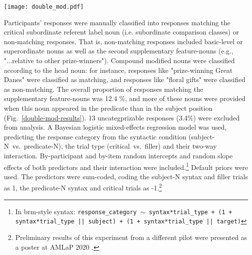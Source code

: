 \begin{figure*}[h]
	\begin{center}
		\texttt{[image: double\_mod.pdf]}
	\end{center}
	\vspace{-0.3cm}
	\caption{Experiment 4 pilot results: Proportions of inferred comparison classes in terms of responses not matching the critical subordinate target label (e.g.,~“...big relative to other dogs/prize-winners/animals”), depending on syntactic position of the noun (x-axis) and trial-type (facets). Error-bars denote bootstrapped 95\% confidence intervals.}
	\label{double-mod-results}
\end{figure*}


Participants' responses were manually classified into responses matching the critical subordinate referent label noun (i.e. subordinate comparison classes) or non-matching responses. That is, non-matching responses included basic-level or superordinate nouns as well as the second supplementary feature-nouns (e.g., "...relative to other prize-winners"). Compound modified nouns were classified according to the head noun: for instance, responses like "prize-winning Great Danes" were classified as matching, and responses like "floral gifts" were classified as non-matching. The overall proportion of responses matching the supplementary feature-nouns was 12.4 \%, and more of these nouns were provided when this noun appeared in the predicate than in the subject position (Fig.~\ref{double-mod-results}). 
13 uncategprizable responses (3.4\%) were excluded from analysis. 
A Bayesian logistic mixed-effects regression model was used, predicting the response category from the syntactic condition (subject-N~vs.~predicate-N), the trial type (critical~vs.~filler) and their two-way interaction. By-participant and by-item random intercepts and random slope effects of both predictors and their interaction were included.\footnote{In brm-style syntax: \texttt{response\_category $\sim$ syntax*trial\_type + (1 + syntax*trial\_type || subject) + (1 + syntax*trial\_type || target)}}  
Default priors were used. The predictors were sum-coded, coding the subject-N syntax and filler trials as 1, the predicate-N syntax and critical trials as -1.\footnote{Preliminary results of this experiment from a different pilot were presented as a poster at AMLaP 2020 \parencite{TesslerEtAl2020AMLaP}. }


